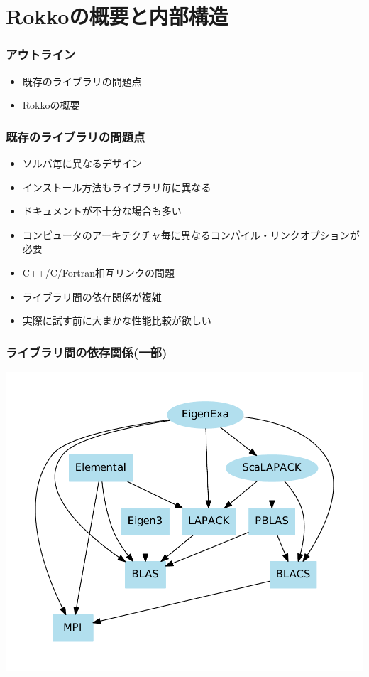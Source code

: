 \section{Rokkoの概要と内部構造}

\begin{frame}
  \frametitle{アウトライン}
  \begin{itemize}
  \item 既存のライブラリの問題点
  \item Rokkoの概要
  \end{itemize}
\end{frame}

\begin{frame}
  \frametitle{既存のライブラリの問題点}
  \begin{itemize}
  \item ソルバ毎に異なるデザイン
  \item インストール方法もライブラリ毎に異なる
  \item ドキュメントが不十分な場合も多い
  \item コンピュータのアーキテクチャ毎に異なるコンパイル・リンクオプションが必要
  \item C++/C/Fortran相互リンクの問題
  \item ライブラリ間の依存関係が複雑
  \item 実際に試す前に大まかな性能比較が欲しい
  \end{itemize}
\end{frame}

\begin{frame}
  \frametitle{ライブラリ間の依存関係(一部)}
  \begin{center}
    \includegraphics[height=0.8\textheight]{figure/library-dependence.pdf}
  \end{center}
\end{frame}

